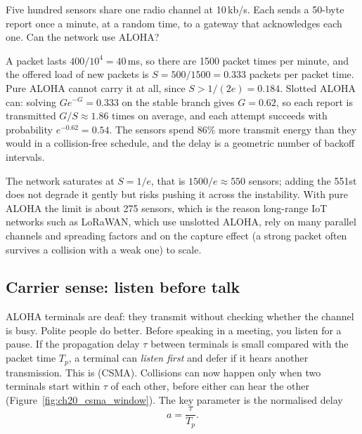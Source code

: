 \begin{worked}
Five hundred sensors share one radio channel at 10\,kb/s. Each sends a 50-byte report once a minute,
at a random time, to a gateway that acknowledges each one. Can the network use ALOHA?

A packet lasts $400/10^4=40$\,ms, so there are 1500 packet times per minute, and the offered load of
new packets is $S=500/1500=0.333$ packets per packet time. Pure ALOHA cannot carry it at all, since
$S>1/(2e)=0.184$. Slotted ALOHA can: solving $Ge^{-G}=0.333$ on the stable branch gives $G=0.62$, so
each report is transmitted $G/S\approx1.86$ times on average, and each attempt succeeds with probability
$e^{-0.62}=0.54$. The sensors spend 86\% more transmit energy than they would in a collision-free schedule,
and the delay is a geometric number of backoff intervals.

The network saturates at $S=1/e$, that is $1500/e\approx550$ sensors; adding the 551st does not degrade
it gently but risks pushing it across the instability. With pure ALOHA the limit is about 275 sensors,
which is the reason long-range IoT networks such as LoRaWAN, which use unslotted ALOHA, rely on many
parallel channels and spreading factors and on the capture effect (a strong packet often survives a
collision with a weak one) to scale.
\end{worked}

\subsection{Carrier sense: listen before talk}

ALOHA terminals are deaf: they transmit without checking whether the channel is busy. Polite people
do better. Before speaking in a meeting, you listen for a pause. If the propagation delay $\tau$
between terminals is small compared with the packet time $T_p$, a terminal can \emph{listen first} and
defer if it hears another transmission. This is  (CSMA). Collisions
can now happen only when two terminals start within $\tau$ of each other, before either can hear the
other (Figure~\ref{fig:ch20_csma_window}). The key parameter is the normalised delay
\begin{equation}
a=\frac{\tau}{T_p}.
\end{equation}



